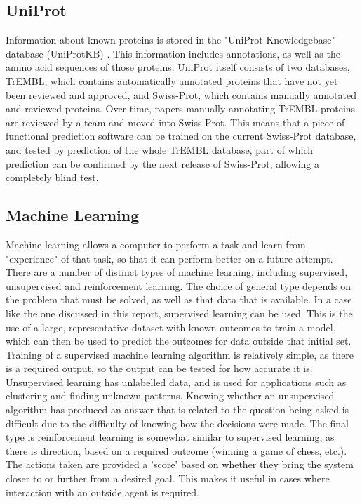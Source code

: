 \documentclass[12pt]{report}
\begin{document}
		\subsection{UniProt}
		
			Information about known proteins is stored in the "UniProt Knowledgebase" database (UniProtKB) \citep{RefWorks:doc:5d80d882e4b074875bbeabb7}.  This information includes annotations, as well as the amino acid sequences of those proteins.  UniProt itself consists of two databases, TrEMBL, which contains automatically annotated proteins that have not yet been reviewed and approved, and Swiss-Prot, which contains manually annotated and reviewed proteins.  Over time, papers manually annotating TrEMBL proteins are reviewed by a team and moved into Swiss-Prot.  This means that a piece of functional prediction software can be trained on the current Swiss-Prot database, and tested by prediction of the whole TrEMBL database, part of which prediction can be confirmed by the next release of Swiss-Prot, allowing a completely blind test. 
			
		\subsection{Machine Learning}
		
			Machine learning allows a computer to perform a task and learn from "experience" of that task, so that it can perform better on a future attempt.  There are a number of distinct types of machine learning, including supervised, unsupervised and reinforcement learning.  The choice of general type depends on the problem that must be solved, as well as that data that is available.  In a case like the one discussed in this report, supervised learning can be used.  This is the use of a large, representative dataset with known outcomes to train a model, which can then be used to predict the outcomes for data outside that initial set.  Training of a supervised machine learning algorithm is relatively simple, as there is a required output, so the output can be tested for how accurate it is.  Unsupervised learning has unlabelled data, and is used for applications such as clustering and finding unknown patterns.  Knowing whether an unsupervised algorithm has produced an answer that is related to the question being asked is difficult due to the difficulty of knowing how the decisions were made.  The final type is reinforcement learning is somewhat similar to supervised learning, as there is direction, based on a required outcome (winning a game of chess, etc.).  The actions taken are provided a 'score' based on whether they bring the system closer to or further from a desired goal.  This makes it useful in cases where interaction with an outside agent is required.
		
\end{document}
